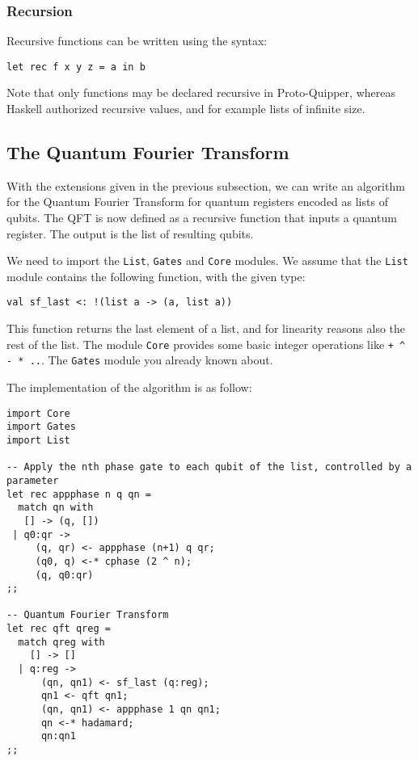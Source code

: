 \subsubsection{Recursion}

Recursive functions can be written using the syntax:
\begin{verbatim}
let rec f x y z = a in b
\end{verbatim}
Note that only functions may be declared recursive in Proto-Quipper, whereas 
Haskell authorized recursive values, and for example lists of infinite size.

\subsection{The Quantum Fourier Transform}

With the extensions given in the previous subsection, we can write an 
algorithm for the Quantum Fourier Transform for quantum registers encoded 
as lists of qubits. The QFT is now defined as a recursive function that 
inputs a quantum register. The output is the list of resulting qubits. 

We need to import the \verb#List#, \verb#Gates# and \verb#Core# modules. 
We assume that the \verb#List# module contains the following function, 
with the given type:
\begin{verbatim}
val sf_last <: !(list a -> (a, list a))
\end{verbatim}
This function returns the last element of a list, and for linearity reasons 
also the rest of the list. The module \verb#Core# provides some basic integer 
operations like \verb#+ ^ - * ..#. The \verb#Gates# module you already known 
about.

The implementation of the algorithm is as follow:

\begin{verbatim}
import Core
import Gates
import List

-- Apply the nth phase gate to each qubit of the list, controlled by a parameter
let rec appphase n q qn =
  match qn with
   [] -> (q, [])
 | q0:qr ->
     (q, qr) <- appphase (n+1) q qr;
     (q0, q) <-* cphase (2 ^ n);
     (q, q0:qr)
;;

-- Quantum Fourier Transform
let rec qft qreg =
  match qreg with
    [] -> []
  | q:reg ->
      (qn, qn1) <- sf_last (q:reg);
      qn1 <- qft qn1;
      (qn, qn1) <- appphase 1 qn qn1;
      qn <-* hadamard;
      qn:qn1
;;
\end{verbatim}
